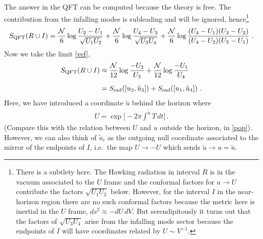 \documentclass[12pt]{article}
\newcommand{\EQ}[1]{\begin{equation}\begin{split} #1
\end{split}\end{equation}}
\begin{document}
The answer in the QFT can be computed because the theory is free. The contribution from the infalling modes is subleading and will be ignored, hence\footnote{There is a subtlety here. The Hawking radiation in interval $R$ is in the vacuum associated to the $U$ frame and the conformal factors for $u\to U$ contribute the factors $\sqrt{U_1U_2}$ below. However, for the interval $I$ in the near-horizon region there are no such conformal factors because the metric here is inertial in the $U$ frame, $ds^2\approx-dU\,dV$. But serendipitously it turns out that the factors of $\sqrt{U_3U_4}$ arise from the infalling mode sector because the endpoints of  $I$ will have coordinates related by $U\sim V^{-1}$.}
\begin{equation}
S_\text{QFT}(R\cup I)=\frac{\cal N}6\log\frac{U_2-U_1}{\sqrt{U_1U_2}}+\frac{\cal N}6\log\frac{U_4-U_3}{\sqrt{U_3U_4}}
+\frac{\cal N}6\log\frac{(U_4-U_1)(U_3-U_2)}{(U_4-U_2)(U_3-U_1)}\ .
\end{equation}
Now we take the limit \eqref{vef},
\EQ{
S_\text{QFT}(R\cup I)&\approx %
\frac{\cal N}{12}\log\frac{-U_2}{U_3}+\frac{\cal N}{12}\log\frac{-U_1}{U_4}\\[5pt]
&=S_\text{rad}([u_2,\tilde u_3])+S_\text{rad}([u_1,\tilde u_4])\ .
}
Here, we have introduced a coordinate $\tilde u$ behind the horizon where
\EQ{
U=\exp\Big[-2\pi\int^{\tilde u}T\,dt\Big]\,.
}
(Compare this with the relation between $U$ and $u$ outside the horizon, in \eqref{pop}). However, we can also think of $\tilde u_i$ as the outgoing null coordinate associated to the mirror of the endpoints of $I$, i.e.~the map $U\to-U$ which sends $\tilde u\to u=\tilde u$.
\end{document}
